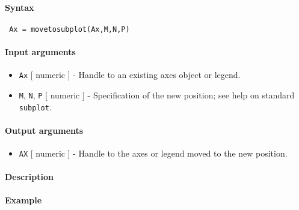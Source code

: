 


	\paragraph{Syntax}
 
 \begin{verbatim}
 Ax = movetosubplot(Ax,M,N,P)
 \end{verbatim}
 
 \paragraph{Input arguments}
 
 \begin{itemize}
 \item
   \texttt{Ax} {[} numeric {]} - Handle to an existing axes object or
   legend.
 \item
   \texttt{M}, \texttt{N}, \texttt{P} {[} numeric {]} - Specification of
   the new position; see help on standard \texttt{subplot}.
 \end{itemize}
 
 \paragraph{Output arguments}
 
 \begin{itemize}
 \item
   \texttt{AX} {[} numeric {]} - Handle to the axes or legend moved to
   the new position.
 \end{itemize}
 
 \paragraph{Description}
 
 \paragraph{Example}


